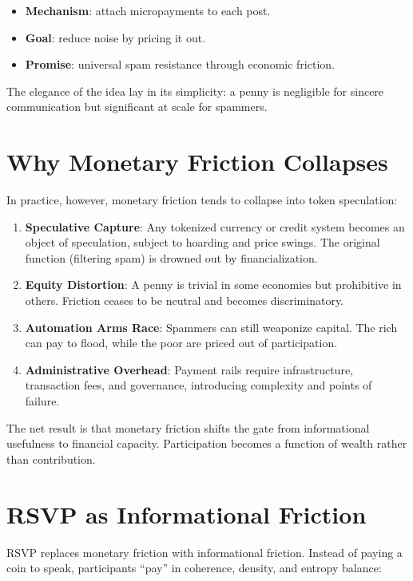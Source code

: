 \documentclass[openany]{book}
\begin{document}
\begin{itemize}
    \item \textbf{Mechanism}: attach micropayments to each post.
    \item \textbf{Goal}: reduce noise by pricing it out.
    \item \textbf{Promise}: universal spam resistance through economic friction.
\end{itemize}

The elegance of the idea lay in its simplicity: a penny is negligible for sincere communication but significant at scale for spammers.

\section{Why Monetary Friction Collapses}

In practice, however, monetary friction tends to collapse into token speculation:

\begin{enumerate}
    \item \textbf{Speculative Capture}: Any tokenized currency or credit system becomes an object of speculation, subject to hoarding and price swings. The original function (filtering spam) is drowned out by financialization.
    \item \textbf{Equity Distortion}: A penny is trivial in some economies but prohibitive in others. Friction ceases to be neutral and becomes discriminatory.
    \item \textbf{Automation Arms Race}: Spammers can still weaponize capital. The rich can pay to flood, while the poor are priced out of participation.
    \item \textbf{Administrative Overhead}: Payment rails require infrastructure, transaction fees, and governance, introducing complexity and points of failure.
\end{enumerate}

The net result is that monetary friction shifts the gate from informational usefulness to financial capacity. Participation becomes a function of wealth rather than contribution.

\section{RSVP as Informational Friction}

RSVP replaces monetary friction with informational friction. Instead of paying a coin to speak, participants ``pay'' in coherence, density, and entropy balance:
\end{document}
